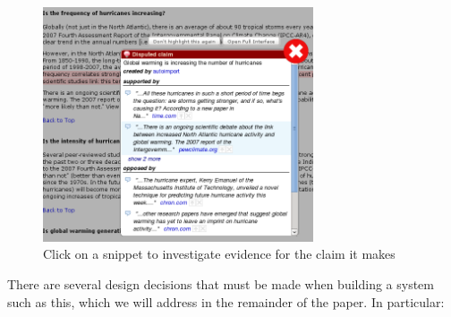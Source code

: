 \documentclass{www2010-submission}
\begin{document}
\begin{figure}[tb]
	\begin{center}
	\includegraphics[width=8cm]{../screenshots/v2_popup_dim2.png}
	\caption{Click on a snippet to investigate evidence for the claim it makes}
	\label{claimview}
	\end{center}
\end{figure}

There are several design decisions that must be made when building a system such as this, which we will address in the remainder of the paper. In particular:
\end{document}
